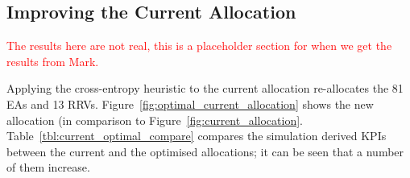 \documentclass[preprint,12pt]{elsarticle}
\begin{document}



\subsection{Improving the Current Allocation}\label{sec:improve_current}
\textcolor{red}{The results here are not real, this is a placeholder section for
when we get the results from Mark.}

Applying the cross-entropy heuristic to the current allocation re-allocates the
81 EAs and 13 RRVs. Figure~\ref{fig:optimal_current_allocation} shows the new
allocation (in comparison to Figure~\ref{fig:current_allocation}.
Table~\ref{tbl:current_optimal_compare} compares the simulation derived KPIs
between the current and the optimised allocations; it can be seen that a number
of them increase.
\end{document}
